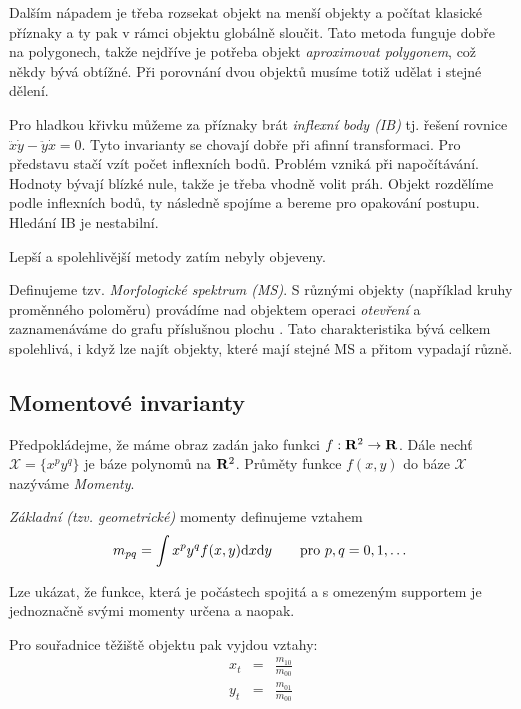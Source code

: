 Dalším nápadem je třeba rozsekat objekt na menší objekty a počítat klasické příznaky a ty pak v rámci objektu globálně 
sloučit. Tato metoda funguje dobře na polygonech, takže nejdříve je potřeba objekt {\em aproximovat polygonem}, což
někdy bývá obtížné. Při porovnání dvou objektů musíme totiž udělat i stejné dělení.

Pro hladkou křivku můžeme za příznaky brát {\em inflexní body (IB)} tj. řešení rovnice $\ddot{x}\dot{y}-\ddot{y}\dot{x}=0$.
Tyto invarianty se chovají dobře při afinní transformaci. Pro představu stačí vzít počet inflexních bodů.
Problém vzniká při napočítávání. Hodnoty bývají blízké nule, takže je třeba vhodně volit práh. Objekt rozdělíme podle 
inflexních bodů, ty následně spojíme a bereme  pro opakování postupu. Hledání IB je nestabilní.

Lepší a spolehlivější metody zatím nebyly objeveny.

 Definujeme tzv. {\em Morfologické spektrum (MS)}. S různými objekty (například
kruhy proměnného poloměru) provádíme nad objektem operaci {\em otevření} a zaznamenáváme do grafu příslušnou plochu .
Tato charakteristika bývá celkem spolehlivá, i když lze najít objekty, které mají stejné MS a přitom vypadají různě. 


\subsection{Momentové invarianty}
Předpokládejme, že máme obraz zadán jako funkci $f:\mathbf{R}^2\rightarrow \mathbf{R} $.
Dále nechť $\mathcal{X}=\{x^py^q\}$ je báze polynomů na $\mathbf{R}^2$. Průměty funkce $f(x,y)$ do báze $\mathcal{X}$ nazýváme
{\em Momenty}.

\def\d{{\rm d}}
{\em Základní (tzv. geometrické)} momenty definujeme vztahem
\begin{equation}
m_{pq}=\int x^py^qf(x,y)\d x\d y\qquad \hbox{pro $p,q=0,1,\dots$}
\end{equation}

Lze ukázat, že funkce, která je počástech spojitá a s omezeným supportem je jednoznačně svými momenty určena
a naopak.

Pro souřadnice těžiště objektu pak vyjdou vztahy:
\begin{eqnarray}
x_t&=&\frac{m_{10}}{m_{00}}\nonumber\\
y_t&=&\frac{m_{01}}{m_{00}}
\end{eqnarray}

